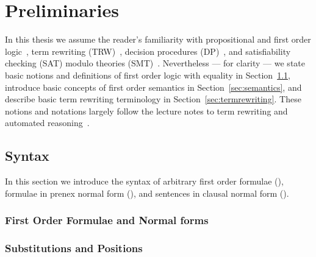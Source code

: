
\chapter{Preliminaries}

%

In this thesis we assume the reader's familiarity with
propositional and first order logic~\cite{Huth:2004:LCS:975331},
term rewriting (\textsf{TRW})~\cite{Baader:1998:TR:280474},
decision procedures (\textsf{DP})~\cite{Kroening:2008:DPA:1391237},
and satisfiability checking (\textsf{SAT}) modulo theories (\textsf{SMT})~\cite{Biere:2009:HSV:1550723}.
Nevertheless --- for clarity --- we state basic notions and  definitions
of first order logic with equality in Section~\ref{sec:syntax},
introduce basic concepts of first order semantics in Section~\ref{sec:semantics},
and describe basic term rewriting terminology in Section~\ref{sec:termrewriting}.
These notions and notations largely follow the lecture notes to term rewriting and automated reasoning~\cite{AM2015tr, GM2013ar}.

\section{Syntax}\label{sec:syntax}

In this section we introduce the syntax of arbitrary first order formulae (\FOF),
formulae in prenex normal form (\PNF),
and sentences in clausal normal form (\CNF).







\subsection{First Order Formulae and Normal forms}





\subsection{Substitutions and Positions}

